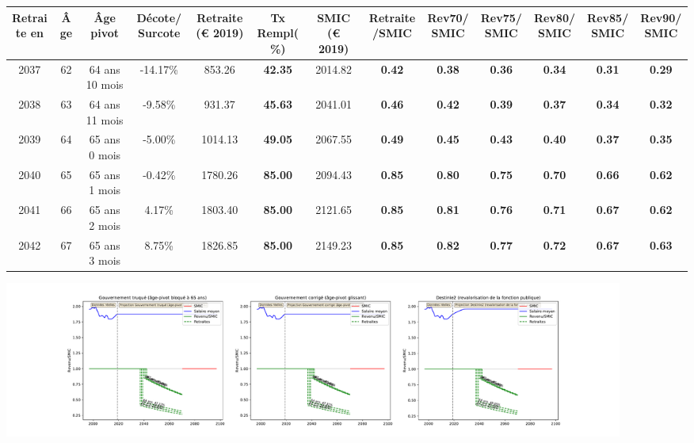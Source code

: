 { \scriptsize \begin{center} 
\begin{tabular}[htb]{|c|c||c|c||c|c||c||c|c|c|c|c|c|} 
\hline 
 Retraite en &  Âge &  Âge pivot &  Décote/Surcote &  Retraite (\euro{} 2019) &  Tx Rempl(\%) &  SMIC (\euro{} 2019) &  Retraite/SMIC &  Rev70/SMIC &  Rev75/SMIC &  Rev80/SMIC &  Rev85/SMIC &  Rev90/SMIC \\ 
\hline \hline 
 2037 &  62 &  64 ans 10 mois &  -14.17\% &  853.26 &  {\bf 42.35} &  2014.82 &  {\bf {\color{red} 0.42}} &  {\bf {\color{red} 0.38}} &  {\bf {\color{red} 0.36}} &  {\bf {\color{red} 0.34}} &  {\bf {\color{red} 0.31}} &  {\bf {\color{red} 0.29}} \\ 
\hline 
 2038 &  63 &  64 ans 11 mois &  -9.58\% &  931.37 &  {\bf 45.63} &  2041.01 &  {\bf {\color{red} 0.46}} &  {\bf {\color{red} 0.42}} &  {\bf {\color{red} 0.39}} &  {\bf {\color{red} 0.37}} &  {\bf {\color{red} 0.34}} &  {\bf {\color{red} 0.32}} \\ 
\hline 
 2039 &  64 &  65 ans 0 mois &  -5.00\% &  1014.13 &  {\bf 49.05} &  2067.55 &  {\bf {\color{red} 0.49}} &  {\bf {\color{red} 0.45}} &  {\bf {\color{red} 0.43}} &  {\bf {\color{red} 0.40}} &  {\bf {\color{red} 0.37}} &  {\bf {\color{red} 0.35}} \\ 
\hline 
 2040 &  65 &  65 ans 1 mois &  -0.42\% &  1780.26 &  {\bf 85.00} &  2094.43 &  {\bf {\color{red} 0.85}} &  {\bf {\color{red} 0.80}} &  {\bf {\color{red} 0.75}} &  {\bf {\color{red} 0.70}} &  {\bf {\color{red} 0.66}} &  {\bf {\color{red} 0.62}} \\ 
\hline 
 2041 &  66 &  65 ans 2 mois &  4.17\% &  1803.40 &  {\bf 85.00} &  2121.65 &  {\bf {\color{red} 0.85}} &  {\bf {\color{red} 0.81}} &  {\bf {\color{red} 0.76}} &  {\bf {\color{red} 0.71}} &  {\bf {\color{red} 0.67}} &  {\bf {\color{red} 0.62}} \\ 
\hline 
 2042 &  67 &  65 ans 3 mois &  8.75\% &  1826.85 &  {\bf 85.00} &  2149.23 &  {\bf {\color{red} 0.85}} &  {\bf {\color{red} 0.82}} &  {\bf {\color{red} 0.77}} &  {\bf {\color{red} 0.72}} &  {\bf {\color{red} 0.67}} &  {\bf {\color{red} 0.63}} \\ 
\hline 
\hline 
\end{tabular} 
\end{center} } 

 \begin{center}\includegraphics[width=0.9\textwidth]{fig/SMIC_1975_22_dest_retraite.pdf}\end{center} \label{fig/SMIC_1975_22_dest_retraite.pdf} 

